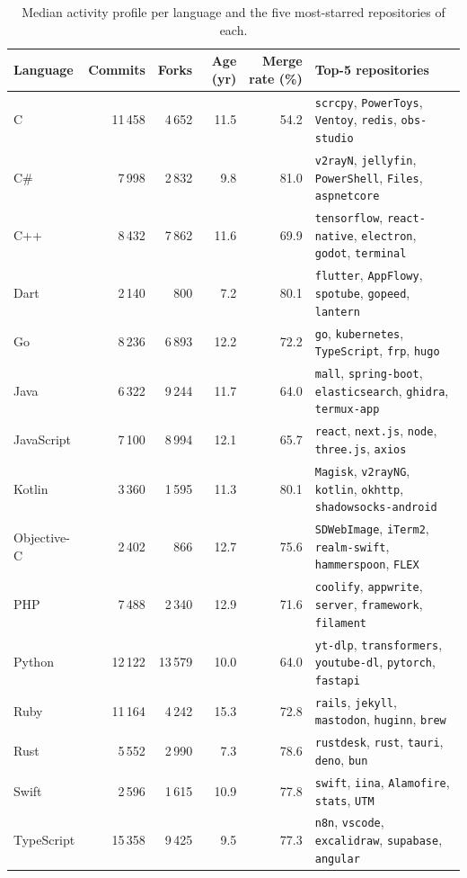 \begin{table}[t]
\centering
\caption{Median activity profile per language and the five most-starred repositories of each.}
\label{tab:sample-profile}
\small
\begin{tabular}{lrrrrp{6.5cm}}
\toprule
\textbf{Language} & \textbf{Commits} & \textbf{Forks} & \textbf{Age (yr)} & \textbf{Merge rate (\%)} & \textbf{Top-5 repositories} \\
\midrule
C & 11\,458 & 4\,652 & 11.5 & 54.2 & \texttt{scrcpy}, \texttt{PowerToys}, \texttt{Ventoy}, \texttt{redis}, \texttt{obs-studio} \\
C\# & 7\,998 & 2\,832 & 9.8 & 81.0 & \texttt{v2rayN}, \texttt{jellyfin}, \texttt{PowerShell}, \texttt{Files}, \texttt{aspnetcore} \\
C++ & 8\,432 & 7\,862 & 11.6 & 69.9 & \texttt{tensorflow}, \texttt{react-native}, \texttt{electron}, \texttt{godot}, \texttt{terminal} \\
Dart & 2\,140 & 800 & 7.2 & 80.1 & \texttt{flutter}, \texttt{AppFlowy}, \texttt{spotube}, \texttt{gopeed}, \texttt{lantern} \\
Go & 8\,236 & 6\,893 & 12.2 & 72.2 & \texttt{go}, \texttt{kubernetes}, \texttt{TypeScript}, \texttt{frp}, \texttt{hugo} \\
Java & 6\,322 & 9\,244 & 11.7 & 64.0 & \texttt{mall}, \texttt{spring-boot}, \texttt{elasticsearch}, \texttt{ghidra}, \texttt{termux-app} \\
JavaScript & 7\,100 & 8\,994 & 12.1 & 65.7 & \texttt{react}, \texttt{next.js}, \texttt{node}, \texttt{three.js}, \texttt{axios} \\
Kotlin & 3\,360 & 1\,595 & 11.3 & 80.1 & \texttt{Magisk}, \texttt{v2rayNG}, \texttt{kotlin}, \texttt{okhttp}, \texttt{shadowsocks-android} \\
Objective-C & 2\,402 & 866 & 12.7 & 75.6 & \texttt{SDWebImage}, \texttt{iTerm2}, \texttt{realm-swift}, \texttt{hammerspoon}, \texttt{FLEX} \\
PHP & 7\,488 & 2\,340 & 12.9 & 71.6 & \texttt{coolify}, \texttt{appwrite}, \texttt{server}, \texttt{framework}, \texttt{filament} \\
Python & 12\,122 & 13\,579 & 10.0 & 64.0 & \texttt{yt-dlp}, \texttt{transformers}, \texttt{youtube-dl}, \texttt{pytorch}, \texttt{fastapi} \\
Ruby & 11\,164 & 4\,242 & 15.3 & 72.8 & \texttt{rails}, \texttt{jekyll}, \texttt{mastodon}, \texttt{huginn}, \texttt{brew} \\
Rust & 5\,552 & 2\,990 & 7.3 & 78.6 & \texttt{rustdesk}, \texttt{rust}, \texttt{tauri}, \texttt{deno}, \texttt{bun} \\
Swift & 2\,596 & 1\,615 & 10.9 & 77.8 & \texttt{swift}, \texttt{iina}, \texttt{Alamofire}, \texttt{stats}, \texttt{UTM} \\
TypeScript & 15\,358 & 9\,425 & 9.5 & 77.3 & \texttt{n8n}, \texttt{vscode}, \texttt{excalidraw}, \texttt{supabase}, \texttt{angular} \\
\bottomrule
\end{tabular}
\end{table}
